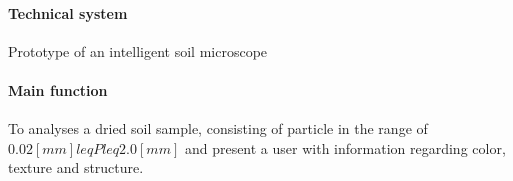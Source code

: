 \paragraph{Technical system}
\begin{sBox}
	Prototype of an intelligent soil microscope
\end{sBox}

\paragraph{Main function}
\begin{sBox}
	To analyses a dried soil sample, consisting of particle in the range of $ 0.02 [mm] leq P leq 2.0 [mm] $ and present a user with information regarding color, texture and structure.
\end{sBox}
